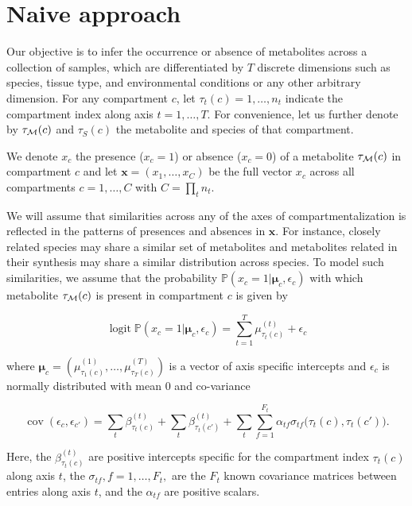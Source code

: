 \documentclass[
11pt, %
oneside, %
english, %
singlespacing, %
headsepline, %
chapterinoneline, %
]{MastersDoctoralThesis} %
\DeclareMathOperator{\logit}{logit}
\DeclareMathOperator{\cov}{cov}
\def\P{\mathbb{P}}
\def\x{\boldsymbol{x}}
\def\bmu{\boldsymbol{\mu}}
\def\M{{\cal M}}
\begin{document}
\section{Naive approach}\label{sec:methods:Naive approach}
Our objective is to infer the occurrence or absence of metabolites across a collection of samples, which are differentiated by $T$ discrete dimensions such as species, tissue type, and environmental conditions or any other arbitrary dimension. For any compartment $c$, let $\tau_t(c) = 1, \ldots, n_t$ indicate the compartment index along axis $t=1, \ldots, T$. For convenience, let us further denote by $\tau_\M(c)$ and $\tau_S(c)$ the metabolite and species of that compartment.

We denote $x_{c}$ the presence ($x_c=1$) or absence ($x_c=0$) of a metabolite $\tau_\M(c)$ in compartment $c$ and let $\x=(x_1, \ldots, x_C)$ be the full vector $x_c$ across all compartments $c=1, \ldots, C$ with $C=\prod_t n_t$.

We will assume that similarities across any of the axes of compartmentalization is reflected in the patterns of presences and absences in $\x$. For instance, closely related species may share a similar set of metabolites and  metabolites related in their synthesis may share a similar distribution across species. To model such similarities, we assume that the probability $\P(x_c=1|\bmu_c, \epsilon_c)$ with which metabolite $\tau_\M(c)$ is present in compartment $c$ is given by

\begin{equation}\label{eq:logit of X}
	\logit \P(x_c=1|\bmu_c, \epsilon_c) = \sum_{t=1}^{T} \mu^{(t)}_{\tau_t(c)} + \epsilon_{c}
\end{equation}

where $\bmu_c=(\mu^{(1)}_{\tau_1(c)}, \ldots, \mu^{(T)}_{\tau_T(c)})$ is a vector of axis specific intercepts and $\epsilon_{c}$ is normally distributed with mean 0 and co-variance

\begin{equation}
	\cov(\epsilon_c, \epsilon_{c'}) = \sum_t \beta^{(t)}_{\tau_t(c)} + \sum_t \beta^{(t)}_{\tau_t(c')} + \sum_t \sum_{f=1}^{F_t} \alpha_{tf} \sigma_{tf}\Big(\tau_t(c), \tau_t(c')\Big).
\end{equation}

Here, the $\beta^{(t)}_{\tau_t(c)}$ are positive intercepts specific for the compartment index $\tau_t(c)$ along axis $t$, the $\sigma_{tf}, f=1, \ldots, F_t,$ are the $F_t$ known covariance matrices between entries along axis $t$, and the $\alpha_{tf}$ are positive scalars.
\end{document}
